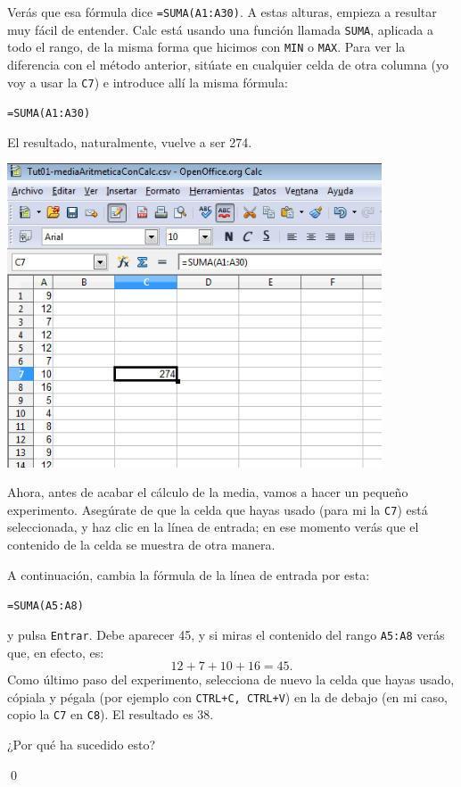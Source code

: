 \documentclass[10pt,a4paper]{article}\usepackage[]{graphicx}\usepackage[]{color}
\newcounter {cont01}
\begin{document}
Verás que esa fórmula dice {\tt =SUMA(A1:A30)}. A estas alturas, empieza a resultar muy fácil de entender. Calc está usando una función llamada {\tt SUMA}, aplicada a todo el rango, de la misma forma que hicimos con {\tt MIN} o {\tt MAX}. Para ver la diferencia con el método anterior, sitúate en cualquier celda de otra columna (yo voy a usar la {\tt C7}) e introduce allí la misma fórmula:
\begin{center}
{\tt =SUMA(A1:A30)}
\end{center}
El resultado, naturalmente, vuelve a ser 274.
    \begin{center}
    \includegraphics[height=9cm]{../fig/Tut01-Calc-Formula-17.png}
    \end{center}
Ahora, antes de acabar el cálculo de la media, vamos a hacer un pequeño experimento. Asegúrate de que la celda que hayas usado (para mi la {\tt C7}) está seleccionada, y haz clic en la línea de entrada; en ese momento verás que el contenido de la celda se muestra de otra manera.

A continuación, cambia la fórmula de la línea de entrada por esta:
\begin{center}
{\tt =SUMA(A5:A8)}
\end{center}
y pulsa {\tt Entrar}. Debe aparecer 45, y si miras el contenido del rango {\tt A5:A8} verás que, en efecto, es:
\[12 + 7 + 10 + 16 = 45.\]
Como último paso del experimento, selecciona de nuevo la celda que hayas usado, cópiala y pégala (por ejemplo con {\tt CTRL+C, CTRL+V}) en la de debajo (en mi caso, copio la {\tt C7} en {\tt C8}). El resultado es 38.

\begin{ejercicio}
\quad
¿Por qué ha sucedido esto?

\qed
\end{ejercicio}
\end{document}
